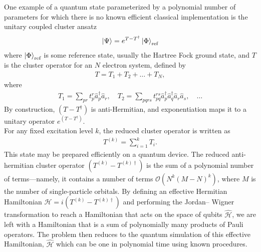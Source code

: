 \documentclass{book}
\theoremstyle{definition}
\newcommand{\had}{\mathcal{H}}
\begin{document}
One example of a quantum state parameterized by a
polynomial number of parameters for which there is no known
efficient classical implementation is the unitary coupled cluster
ansatz
\begin{align}
\ket{\Psi} = e^{T - T^\dagger}\ket{\Phi}_\text{ref}
\end{align}
where $\ket{\Phi}_\text{ref}$ is some reference state, usually the Hartree Fock ground state, and $T$ is the cluster operator for an $N$ electron system, defined by
\begin{align}
T =T_1 + T_2 + \dots + T_N,
\end{align}
where
\begin{align}
T_1 = \sum_{pr}t^r_p \hat{a}_p^\dagger\hat{a}_r, \quad T_2 = \sum_{pqrs}t^{rs}_{pq}\hat{a}_p^\dagger \hat{a}_q^\dagger\hat{a}_r \hat{a}_s,\quad \dots
\end{align}
By construction, $(T - T^\dagger)$ is anti-Hermitian, and exponentiation maps it to a unitary operator $e^(T - T^\dagger)$. \\

For any fixed excitation level $k$, the reduced cluster operator is written as
\begin{align}
T^{(k)} = \sum^k_{i=1}T_i.
\end{align}
This state may be prepared efficiently on a quantum
device. The reduced anti-hermitian cluster operator  $(T^{(k)} - T^{(k)\dagger})$ is the sum of a polynomial number of terms—namely, it contains
a number of terms $\mathcal{O}(N^k(M-N)^k)$, where $M$ is the number of
single-particle orbitals. By defining an effective Hermitian
Hamiltonian $\had = i(T^{(k)} - T^{(k)\dagger})$ and performing the Jordan–
Wigner transformation to reach a Hamiltonian that acts on the
space of qubits $\hat{\had}$, we are left with a Hamiltonian that is a sum of polynomially many products of Pauli operators. The problem then reduces to the quantum simulation of this effective Hamiltonian, $\hat{\had}$ which can be one in polynomial time using known procedures. 





















\newpage
\end{document}
